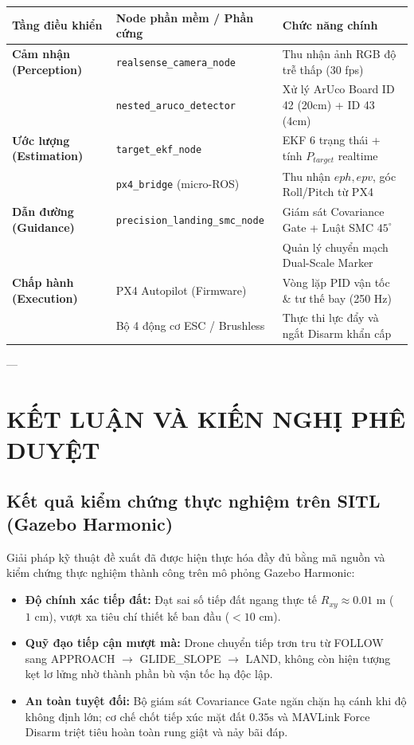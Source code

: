 \documentclass[12pt,a4paper]{article}
\begin{document}
\begin{table}[h!]
\centering
\small
\begin{tabular}{@{}lll@{}}
\toprule
\textbf{Tầng điều khiển} & \textbf{Node phần mềm / Phần cứng} & \textbf{Chức năng chính} \\ \midrule
\textbf{Cảm nhận (Perception)} & \texttt{realsense\_camera\_node} & Thu nhận ảnh RGB độ trễ thấp (30 fps) \\
 & \texttt{nested\_aruco\_detector} & Xử lý ArUco Board ID 42 (20cm) + ID 43 (4cm) \\
\midrule
\textbf{Ước lượng (Estimation)} & \texttt{target\_ekf\_node} & EKF 6 trạng thái + tính $P_{target}$ realtime \\
 & \texttt{px4\_bridge} (micro-ROS) & Thu nhận $eph, epv$, góc Roll/Pitch từ PX4 \\
\midrule
\textbf{Dẫn đường (Guidance)} & \texttt{precision\_landing\_smc\_node} & Giám sát Covariance Gate + Luật SMC $45^\circ$ \\
 & & Quản lý chuyển mạch Dual-Scale Marker \\
\midrule
\textbf{Chấp hành (Execution)} & PX4 Autopilot (Firmware) & Vòng lặp PID vận tốc \& tư thế bay (250 Hz) \\
 & Bộ 4 động cơ ESC / Brushless & Thực thi lực đẩy và ngắt Disarm khẩn cấp \\ \bottomrule
\end{tabular}
\end{table}

---

\section{KẾT LUẬN VÀ KIẾN NGHỊ PHÊ DUYỆT}

\subsection{Kết quả kiểm chứng thực nghiệm trên SITL (Gazebo Harmonic)}
Giải pháp kỹ thuật đề xuất đã được hiện thực hóa đầy đủ bằng mã nguồn và kiểm chứng thực nghiệm thành công trên mô phỏng Gazebo Harmonic:
\begin{itemize}[noitemsep,topsep=2pt]
    \item \textbf{Độ chính xác tiếp đất:} Đạt sai số tiếp đất ngang thực tế $R_{xy} \approx 0.01\text{ m}$ ($1\text{ cm}$), vượt xa tiêu chí thiết kế ban đầu ($< 10\text{ cm}$).
    \item \textbf{Quỹ đạo tiếp cận mượt mà:} Drone chuyển tiếp trơn tru từ FOLLOW sang APPROACH $\to$ GLIDE\_SLOPE $\to$ LAND, không còn hiện tượng kẹt lơ lửng nhờ thành phần bù vận tốc hạ độc lập.
    \item \textbf{An toàn tuyệt đối:} Bộ giám sát Covariance Gate ngăn chặn hạ cánh khi độ không định lớn; cơ chế chốt tiếp xúc mặt đất $0.35\text{s}$ và MAVLink Force Disarm triệt tiêu hoàn toàn rung giật và nảy bãi đáp.
\end{itemize}
\end{document}
